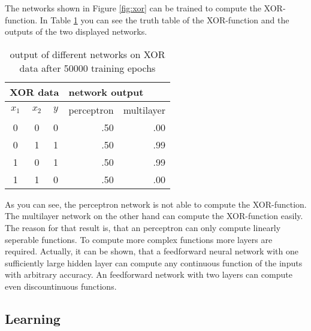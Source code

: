 The networks shown in Figure \ref{fig:xor} can be trained to compute the XOR-function. In Table \ref{tab:xor} you can see the truth table of the XOR-function and the outputs of the two displayed networks.
\\
\begin{table}[h]
  \centering
  \begin{tabular}[c]{cccrr}
    \hline
    \multicolumn{3}{l}{XOR data} 		& \multicolumn{2}{l}{network output}	\\
    \hline
    $x_1$ 		& $x_2$		& $y$	 		& 	perceptron 	& 	multilayer 	\\
    \hline
    0 				& 0 				& 0				& .50				& .00				\\
    0 				& 1 				& 1				& .50 				& .99 				\\
    1 				& 0 				& 1				& .50 				& .99 				\\
    1 				& 1 				& 0				& .50 				& .00 				\\
    \hline
  \end{tabular}
  \caption{output of different networks on XOR data after 50000 training epochs}
  \label{tab:xor}
  
\end{table}

As you can see, the perceptron network is not able to compute the XOR-function. The multilayer network on the other hand can compute the XOR-function easily. The reason for that result is, that an perceptron can only compute linearly seperable functions. To compute more complex functions more layers are required. Actually, it can be shown, that a feedforward neural network with one sufficiently large hidden layer can compute any continuous function of the inputs with arbitrary accuracy.  An feedforward network with two layers can compute even discountinuous functions. 


\subsection{Learning}

